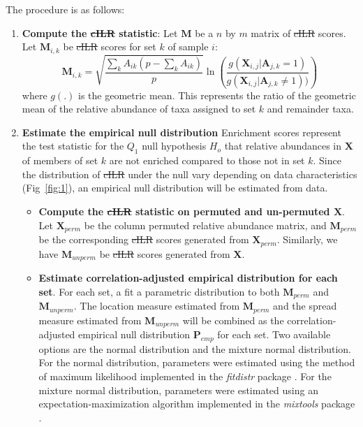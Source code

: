 \documentclass[10pt,letterpaper]{article}
\providecommand{\DIFaddtex}[1]{{\protect\color{blue}\uwave{#1}}} %
\providecommand{\DIFdeltex}[1]{{\protect\color{red}\sout{#1}}}                      %
\providecommand{\DIFaddbegin}{} %
\providecommand{\DIFaddend}{} %
\providecommand{\DIFdelbegin}{} %
\providecommand{\DIFdelend}{} %
\providecommand{\DIFadd}[1]{\texorpdfstring{\DIFaddtex{#1}}{#1}} %
\providecommand{\DIFdel}[1]{\texorpdfstring{\DIFdeltex{#1}}{}} %
\newcommand{\DIFscaledelfig}{0.5}
\newlength{\DIFdelgraphicswidth} %
\newlength{\DIFdelgraphicsheight} %
\newcommand{\DIFaddincludegraphics}[2][]{{\color{blue}\fbox{\DIFOincludegraphics[#1]{#2}}}} %
\newcommand{\DIFdelincludegraphics}[2][]{%
\sbox{\DIFdelgraphicsbox}{\DIFOincludegraphics[#1]{#2}}%
\settoboxwidth{\DIFdelgraphicswidth}{\DIFdelgraphicsbox} %
\settoboxtotalheight{\DIFdelgraphicsheight}{\DIFdelgraphicsbox} %
\scalebox{\DIFscaledelfig}{%
\parbox[b]{\DIFdelgraphicswidth}{\usebox{\DIFdelgraphicsbox}\\[-\baselineskip] \rule{\DIFdelgraphicswidth}{0em}}\llap{\resizebox{\DIFdelgraphicswidth}{\DIFdelgraphicsheight}{%
\setlength{\unitlength}{\DIFdelgraphicswidth}%
\begin{picture}(1,1)%
\thicklines\linethickness{2pt} %
{\color[rgb]{1,0,0}\put(0,0){\framebox(1,1){}}}%
{\color[rgb]{1,0,0}\put(0,0){\line( 1,1){1}}}%
{\color[rgb]{1,0,0}\put(0,1){\line(1,-1){1}}}%
\end{picture}%
}\hspace*{3pt}}} %
} %
\DeclareRobustCommand{\DIFaddbegin}{\DIFOaddbegin \let\includegraphics\DIFaddincludegraphics} %
\DeclareRobustCommand{\DIFaddend}{\DIFOaddend \let\includegraphics\DIFOincludegraphics} %
\DeclareRobustCommand{\DIFdelbegin}{\DIFOdelbegin \let\includegraphics\DIFdelincludegraphics} %
\DeclareRobustCommand{\DIFdelend}{\DIFOaddend \let\includegraphics\DIFOincludegraphics} %
\begin{document}
The procedure is as follows:  
\begin{enumerate}
    \item \textbf{Compute the \DIFdelbegin \DIFdel{cILR }\DIFdelend \DIFaddbegin \DIFadd{CBEA }\DIFaddend statistic}: Let $\mathbf{M}$ be a $n$ by $m$ matrix of \DIFdelbegin \DIFdel{cILR }\DIFdelend \DIFaddbegin \DIFadd{CBEA }\DIFaddend scores. Let $\mathbf{M}_{i,k}$ be \DIFdelbegin \DIFdel{cILR }\DIFdelend \DIFaddbegin \DIFadd{CBEA }\DIFaddend scores for set $k$ of sample $i$:   
    \begin{equation}\label{main_eq}
        \mathbf{M}_{i,k} = \sqrt{\frac{\sum_k A_{ik}(p - \sum_k A_{ik})}{p}} \ln \left( \frac{g(\mathbf{X}_{i,j}|\mathbf{A}_{j,k} = 1)}{g(\mathbf{X}_{i,j}|\mathbf{A}_{j,k} \neq 1))} \right)
    \end{equation}
    where $g(.)$ is the geometric mean. This represents the ratio of the geometric mean of the relative abundance of taxa assigned to set $k$ and remainder taxa. 
    \item \textbf{Estimate the empirical null distribution} Enrichment scores represent the test statistic for the $Q_1$ null hypothesis $H_o$ that relative abundances in $\mathbf{X}$ of members of set $k$ are not enriched compared to those not in set $k$. Since the distribution of \DIFdelbegin \DIFdel{cILR }\DIFdelend \DIFaddbegin \DIFadd{CBEA }\DIFaddend under the null vary depending on data characteristics (Fig~\ref{fig:1}), an empirical null distribution will be estimated from data.
    \begin{itemize}
        \item \textbf{Compute the \DIFdelbegin \DIFdel{cILR }\DIFdelend \DIFaddbegin \DIFadd{CBEA }\DIFaddend statistic on permuted and un-permuted $\mathbf{X}$}.  Let $\mathbf{X}_{perm}$ be the column permuted relative abundance matrix, and $\mathbf{M}_{perm}$ be the corresponding \DIFdelbegin \DIFdel{cILR }\DIFdelend \DIFaddbegin \DIFadd{CBEA }\DIFaddend scores generated from $\mathbf{X}_{perm}$. Similarly, we have $\mathbf{M}_{unperm}$ be \DIFdelbegin \DIFdel{cILR }\DIFdelend \DIFaddbegin \DIFadd{CBEA }\DIFaddend scores generated from $\mathbf{X}$.
        \item \textbf{Estimate correlation-adjusted empirical distribution for each set}. For each set, a fit a parametric distribution to both $\mathbf{M}_{perm}$ and $\mathbf{M}_{unperm}$. The location measure estimated from $\mathbf{M}_{perm}$ and the spread measure estimated from $\mathbf{M}_{unperm}$ will be combined as the correlation-adjusted empirical null distribution $\mathbf{P}_{emp}$ for each set. Two available options are the normal distribution and the mixture normal distribution. For the normal distribution, parameters were estimated using the method of maximum likelihood implemented in the \emph{fitdistr} package \cite{delignette-muller2015}. For the mixture normal distribution, parameters were estimated using an expectation-maximization algorithm implemented in the \emph{mixtools} package \cite{benaglia2009}. 

\end{itemize}
\end{enumerate}
\end{document}
